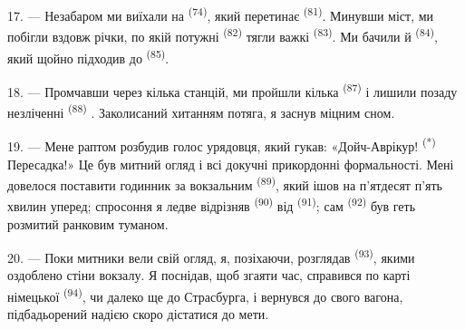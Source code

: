 17. --- Незабаром ми виїхали на  \textsuperscript{(74)},
який перетинає  \textsuperscript{(81)}. Минувши міст, ми побігли
вздовж річки, по якій потужні  \textsuperscript{(82)} тягли
важкі  \textsuperscript{(83)}. Ми бачили й  \textsuperscript{(84)}, який щойно підходив до 
\textsuperscript{(85)}.

18. --- Промчавши через кілька станцій, ми пройшли кілька 
\textsuperscript{(87)} і лишили позаду незліченні 
\textsuperscript{(88)} . Заколисаний хитанням потяга,
я заснув міцним сном.

\VUsaut{3.0mm}
\VUsaut{3.0mm}

19. --- Мене раптом розбудив голос урядовця, який гукав: «Дойч-Аврікур!
\textsuperscript{(*)} Пересадка!» Це був митний огляд і всі докучні прикордонні
формальності. Мені довелося поставити годинник за вокзальним
 \textsuperscript{(89)}, який ішов на п'ятдесят п'ять хвилин
уперед; спросоння я ледве відрізняв 
\textsuperscript{(90)} від  \textsuperscript{(91)}; сам
 \textsuperscript{(92)} був геть розмитий ранковим туманом.

20. --- Поки митники вели свій огляд, я, позіхаючи, розглядав 
\textsuperscript{(93)}, якими оздоблено стіни вокзалу. Я поснідав, щоб згаяти
час, справився по карті німецької  \textsuperscript{(94)}, чи
далеко ще до Страсбурга, і вернувся до свого вагона, підбадьорений надією скоро
дістатися до мети.
\VUsaut{6.0mm}
\VUfilet{22mm}
